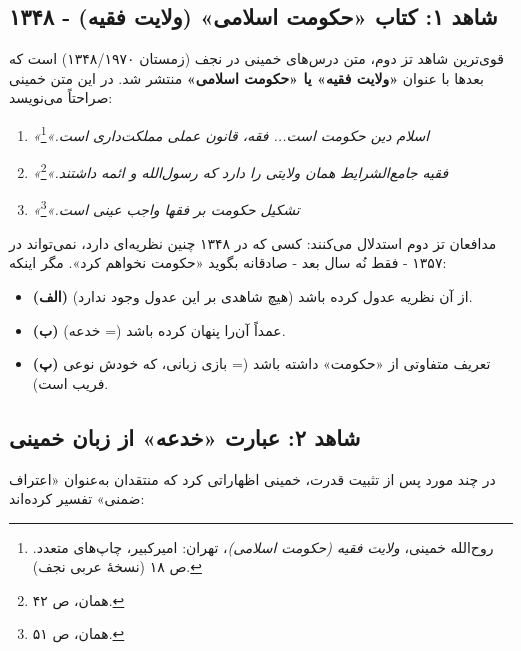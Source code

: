\documentclass[12pt,a4paper]{book}
\newcommand{\keyword}[1]{\textbf{\textcolor{cPrimary}{#1}}}
\begin{document}
\subsection{شاهد ۱: کتاب «حکومت اسلامی» (ولایت فقیه) - ۱۳۴۸}

قوی‌ترین شاهد تز دوم، متن درس‌های خمینی در نجف (زمستان ۱۳۴۸/۱۹۷۰) است که بعدها با عنوان \keyword{«ولایت فقیه» یا «حکومت اسلامی»} منتشر شد. در این متن خمینی صراحتاً می‌نویسد:

\begin{warningBox}
\begin{enumerate}[label=\textcolor{cAccent}{\bfseries\arabic*.}, rightmargin=2em]
    \item \textit{«اسلام دین حکومت است... فقه، قانون عملی مملکت‌داری است.»}\footnote{روح‌الله خمینی، \textit{ولایت فقیه (حکومت اسلامی)}، تهران: امیرکبیر، چاپ‌های متعدد. ص ۱۸ (نسخهٔ عربی نجف).}

    \item \textit{«فقیه جامع‌الشرایط همان ولایتی را دارد که رسول‌الله و ائمه داشتند.»}\footnote{همان، ص ۴۲.}

    \item \textit{«تشکیل حکومت بر فقها واجب عینی است.»}\footnote{همان، ص ۵۱.}
\end{enumerate}
\end{warningBox}

مدافعان تز دوم استدلال می‌کنند: کسی که در ۱۳۴۸ چنین نظریه‌ای دارد، نمی‌تواند در ۱۳۵۷ - فقط نُه سال بعد - صادقانه بگوید «حکومت نخواهم کرد». مگر اینکه:

\begin{itemize}[label=\textcolor{cAccent}{$\bullet$}, rightmargin=2em]
    \item \textbf{(الف)} از آن نظریه عدول کرده باشد (هیچ شاهدی بر این عدول وجود ندارد).
    \item \textbf{(ب)} عمداً آن‌را پنهان کرده باشد (= خدعه).
    \item \textbf{(پ)} تعریف متفاوتی از «حکومت» داشته باشد (= بازی زبانی، که خودش نوعی فریب است).
\end{itemize}

\subsection{شاهد ۲: عبارت «خدعه» از زبان خمینی}

در چند مورد پس از تثبیت قدرت، خمینی اظهاراتی کرد که منتقدان به‌عنوان «اعتراف ضمنی» تفسیر کرده‌اند:
\end{document}
